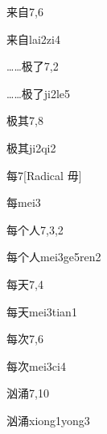 \begin{entry}{来自}{7,6}
  \begin{phonetics}{来自}{lai2zi4}
  \end{phonetics}
\end{entry}

\begin{entry}{……极了}{7,2}
  \begin{phonetics}{……极了}{ji2le5}
  \end{phonetics}
\end{entry}

\begin{entry}{极其}{7,8}
  \begin{phonetics}{极其}{ji2qi2}
  \end{phonetics}
\end{entry}

\begin{entry}{每}{7}[Radical 毋]
  \begin{phonetics}{每}{mei3}
  \end{phonetics}
\end{entry}

\begin{entry}{每个人}{7,3,2}
  \begin{phonetics}{每个人}{mei3ge5ren2}
  \end{phonetics}
\end{entry}

\begin{entry}{每天}{7,4}
  \begin{phonetics}{每天}{mei3tian1}
  \end{phonetics}
\end{entry}

\begin{entry}{每次}{7,6}
  \begin{phonetics}{每次}{mei3ci4}
  \end{phonetics}
\end{entry}

\begin{entry}{汹涌}{7,10}
  \begin{phonetics}{汹涌}{xiong1yong3}
  \end{phonetics}
\end{entry}

